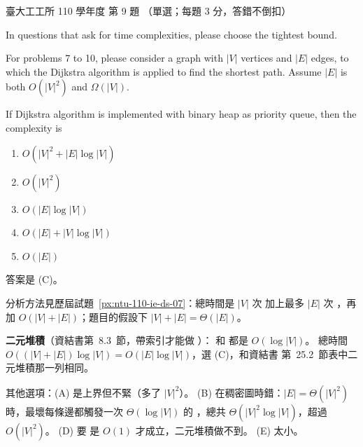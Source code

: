 \begin{pastexam}[label={px:ntu-110-ie-ds-09}]{臺大工工所 110 學年度 第 9 題}
（單選；每題 3 分，答錯不倒扣）

In questions that ask for time complexities, please choose the tightest bound.

For problems 7 to 10, please consider a graph with $|V|$ vertices and $|E|$ edges, to which the Dijkstra
algorithm is applied to find the shortest path. Assume $|E|$ is both $O(|V|^2)$ and $\Omega(|V|)$.

If Dijkstra algorithm is implemented with binary heap as priority queue, then the complexity is

\begin{enumerate}[label=(\Alph*)]
\item $O(|V|^2+|E|\log|V|)$
\item $O(|V|^2)$
\item $O(|E|\log|V|)$
\item $O(|E|+|V|\log|V|)$
\item $O(|E|)$
\end{enumerate}
\end{pastexam}

\begin{pastsoln}
答案是 (C)。

分析方法見歷屆試題~\ref{px:ntu-110-ie-ds-07}：總時間是 $|V|$ 次  加上最多 $|E|$ 次 ，再加 $O(|V| + |E|)$；題目的假設下 $|V| + |E| = \Theta(|E|)$。

\textbf{二元堆積}（資結書第~8.3~節，帶索引才能做 ）： 和
 都是 $O(\log|V|)$。 總時間 $O((|V| + |E|)\log|V|) = O(|E|\log|V|)$，選 (C)，和資結書
第~25.2~節表中二元堆積那一列相同。

其他選項：(A) 是上界但不緊（多了 $|V|^2$）。 (B) 在稠密圖時錯：$|E| = \Theta(|V|^2)$ 時，最壞每條邊都觸發一次
$\Theta(\log|V|)$ 的 ，總共 $\Theta(|V|^2\log|V|)$，超過 $O(|V|^2)$。 (D) 要 
是 $O(1)$ 才成立，二元堆積做不到。 (E) 太小。
\end{pastsoln}
